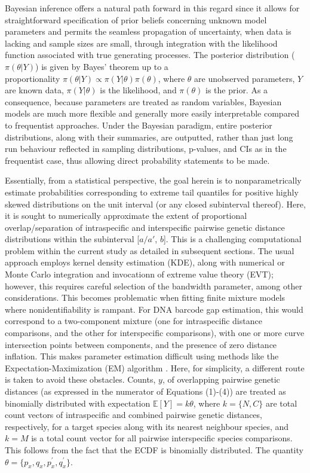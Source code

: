 \documentclass[12pt]{article}
\begin{document}
Bayesian inference offers a natural path forward in this regard since it allows for \\ straightforward specification of prior beliefs concerning unknown model parameters and permits the seamless propagation of uncertainty, when data is lacking and sample sizes are small, through integration with the likelihood function associated with true generating processes. The posterior distribution ($\pi(\theta | Y)$) is given by Bayes' theorem up to a \\ proportionality $\pi(\theta | Y) \propto \pi(Y | \theta)\pi(\theta)$, where $\theta$ are unobserved parameters, $Y$ are known data, $\pi(Y | \theta)$ is the likelihood, and $\pi(\theta)$ is the prior.  As a consequence, because parameters are treated as random variables, Bayesian models are much more flexible and generally more easily interpretable compared to frequentist approaches. Under the Bayesian paradigm, entire posterior distributions, along with their summaries, are outputted, rather than just long run behaviour reflected in sampling distributions, p-values, and CIs as in the frequentist case, thus allowing direct probability statements to be made. 

Essentially, from a statistical perspective, the goal herein is to nonparametrically estimate probabilities corresponding to extreme tail quantiles for positive highly skewed distributions on the unit interval  (or any closed subinterval thereof). Here, it is sought to numerically approximate the extent of proportional overlap/separation of intraspecific and interspecific pairwise genetic distance distributions within the subinterval [$a/a'$, $b$]. This is a challenging computational problem within the current study as detailed in subsequent sections. The usual approach employs kernel density estimation (KDE), along with numerical or Monte Carlo integration and invocationn of extreme value theory (EVT); however, this requires careful selection of the bandwidth parameter, among other considerations. This becomes problematic when fitting finite mixture models where nonidentifiability is rampant. For DNA barcode gap estimation, this would correspond to a two-component mixture (one for intraspecific distance comparisons, and the other for interspecific comparisons), with one or more curve intersection points between components, and the presence of zero distance inflation. This makes parameter estimation difficult using methods like the Expectation-Maximization (EM) algorithm \citep{dempster1977maximum}. Here, for simplicity, a different route is taken to avoid these obstacles. Counts, $y$, of overlapping pairwise genetic distances (as expressed in the numerator of Equations (1)-(4)) are treated as binomially distributed with expectation $\mathbb{E}[Y] = k\theta$, where $k = \{N, C\}$ are total count vectors of intraspecific and combined pairwise genetic distances, respectively, for a target species along with its nearest neighbour species, and $k = M$ is a total count vector for all pairwise interspecific species comparisons. This follows from the fact that the ECDF is binomially distributed. The quantity $\theta = \{p_x, q_x, p^{'}_x, q^{'}_x\}$. 
\end{document}
